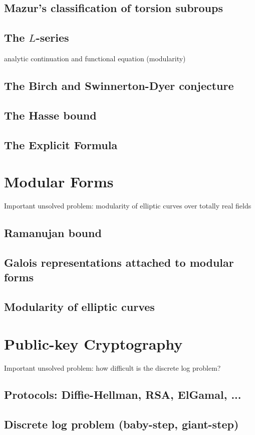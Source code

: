 \documentclass{book}
\begin{document}
\section{Mazur's classification of torsion subroups}
\section{The $L$-series}
analytic continuation and functional equation (modularity)
\section{The Birch and Swinnerton-Dyer conjecture}
\section{The Hasse bound}
\section{The Explicit Formula}



\chapter{Modular Forms}
Important unsolved problem: modularity of elliptic curves
over totally real fields

\section{Ramanujan bound}
\section{Galois representations attached to modular forms}
\section{Modularity of elliptic curves}




\chapter{Public-key Cryptography}

Important unsolved problem: how difficult is the discrete log problem?

\section{Protocols: Diffie-Hellman, RSA, ElGamal, ...}
\section{Discrete log problem (baby-step, giant-step)}




\end{document}
